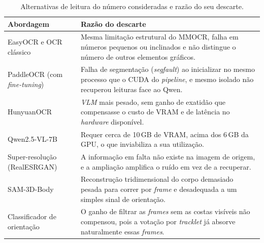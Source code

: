 
\begin{table}[htbp]
\centering
\caption{Alternativas de leitura do número consideradas e razão do seu descarte.}
\label{tab:alternativas}
\renewcommand{\arraystretch}{1.35}
\setlength{\tabcolsep}{6pt}
\begin{tabular}{|>{\raggedright\arraybackslash}p{3.6cm}|p{9.0cm}|}
\hline
\textbf{Abordagem} & \textbf{Razão do descarte} \\
\hline
EasyOCR e OCR clássico &
Mesma limitação estrutural do MMOCR, falha em números pequenos ou inclinados e não
distingue o número de outros elementos gráficos. \\
\hline
PaddleOCR (com \emph{fine-tuning}) &
Falha de segmentação (\emph{segfault}) ao inicializar no mesmo processo que o CUDA do
\emph{pipeline}, e mesmo isolado não recuperou leituras face ao Qwen. \\
\hline
HunyuanOCR &
\emph{VLM} mais pesado, sem ganho de exatidão que compensasse o custo de VRAM e de
latência no \emph{hardware} disponível. \\
\hline
Qwen2.5-VL-7B &
Requer cerca de 10\,GB de VRAM, acima dos 6\,GB da GPU, o que inviabiliza a sua
utilização. \\
\hline
Super-resolução (RealESRGAN) &
A informação em falta não existe na imagem de origem, e a ampliação amplifica o ruído
em vez de a recuperar. \\
\hline
SAM-3D-Body &
Reconstrução tridimensional do corpo demasiado pesada para correr por \emph{frame} e
desadequada a um simples sinal de orientação. \\
\hline
Classificador de orientação &
O ganho de filtrar as \emph{frames} sem as costas visíveis não compensou, pois a votação
por \emph{tracklet} já absorve naturalmente essas \emph{frames}. \\
\hline
\end{tabular}
\end{table}


